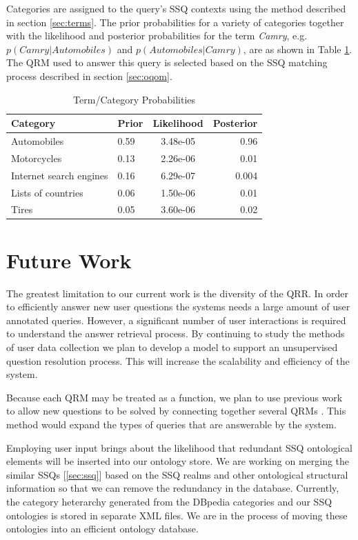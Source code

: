 Categories are assigned to the query's SSQ contexts using the method described in section \ref{sec:terms}. The prior probabilities for a variety of categories
together with the likelihood and posterior probabilities for the term \emph{Camry}, e.g. $p(Camry | Automobiles)$ and $p(Automobiles | Camry )$, are as
shown in Table \ref{tab:prob}.
The QRM used to answer this query is selected based on the SSQ matching
process described in section \ref{sec:oqom}.
\begin{table}
  \begin{tabular}{ | l | l | c | r | }
    \hline
    Category & Prior & Likelihood & Posterior \\ \hline
    Automobiles & 0.59 & 3.48e-05 & 0.96 \\ 
    Motorcycles & 0.13 & 2.26e-06 & 0.01 \\
    Internet search engines & 0.16 & 6.29e-07 & 0.004 \\ 
    Lists of countries & 0.06 & 1.50e-06 & 0.01 \\
    Tires & 0.05 & 3.60e-06 & 0.02 \\
    \hline
  \end{tabular}
\caption{Term/Category Probabilities}
\label{tab:prob}
\end{table}

\section{Future Work}

The greatest limitation to our current work is the diversity of the
QRR.  In order to efficiently answer new user questions the systems
needs a large amount of user annotated queries.  However, a
significant number of user interactions is required to understand the
answer retrieval process.  By continuing to study the methods of user
data collection we plan to develop a model to support an unsupervised
question resolution process.  This will increase the scalability and
efficiency of the system.

Because each QRM may be treated as a function, we plan to use
previous work to allow new questions to be solved by connecting
together several QRMs \cite{morpheus1, transformscout}.  This method
would expand the types of queries that are answerable by the system.

Employing user input brings about the
likelihood that redundant SSQ ontological elements will be inserted
into our ontology store. We are working on merging the similar SSQs
[\ref{sec:ssq}] based on the SSQ realms and other ontological
structural information so that we can remove the redundancy in the
database.  Currently, the category heterarchy generated from the DBpedia
categories and our SSQ ontologies is stored in separate XML files. We
are in the process of moving these ontologies into an efficient
ontology database.

